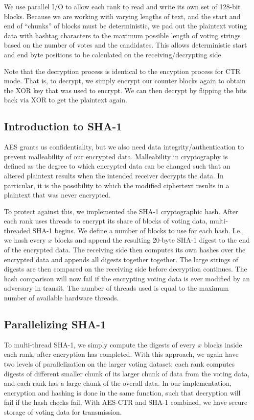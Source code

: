 \documentclass[final,5p,times,twocolumn,authoryear, 10pt]{elsarticle}
\begin{document}
We use parallel I/O to allow each rank to read and write its own set of 128-bit
blocks. Because we are working with varying lengths of text, and the start and
end of ``chunks'' of blocks must be deterministic, we pad out the plaintext
voting data with hashtag characters to the maximum possible length of voting
strings based on the number of votes and the candidates. This allows
deterministic start and end byte positions to be calculated on the
receiving/decrypting side.

Note that the decryption process is identical to the encyption process for CTR
mode. That is, to decrypt, we simply encrypt our counter blocks again to obtain
the XOR key that was used to encrypt. We can then decrypt by flipping the bits
back via XOR to get the plaintext again.

\subsection{Introduction to SHA-1}

AES grants us confidentiality, but we also need data integrity/authentication
to prevent malleability of our encrypted data. Malleability in cryptography is
defined as the degree to which encrypted data can be changed such that an
altered plaintext results when the intended receiver decrypts the data. In
particular, it is the possibility to which the modified ciphertext results in a
plaintext that was never encrypted.

To protect against this, we implemented the SHA-1 cryptographic hash. After each
rank uses threads to encrypt its share of blocks of voting data, multi-threaded
SHA-1 begins. We define a number of blocks to use for each hash. I.e., we hash
every $x$ blocks and append the resulting 20-byte SHA-1 digest to the end of the
encrypted data. The receiving side then computes its own hashes over the
encrypted data and appends all digests together together. The large strings of
digests are then compared on the receiving side before decryption continues. The
hash comparison will now fail if the encrypting voting data is ever modified by
an adversary in transit. The number of threads used is equal to the maximum
number of available hardware threads.

\subsection{Parallelizing SHA-1}

To multi-thread SHA-1, we simply compute the digests of every $x$ blocks inside
each rank, after encryption has completed. With this approach, we again have two
levels of parallelization on the larger voting dataset: each rank computes
digests of different smaller chunk of its larger chunk of data from the voting
data, and each rank has a large chunk of the overall data. In our
implementation, encryption and hashing is done in the same function, such that
decryption will fail if the hash checks fail. With AES-CTR and SHA-1 combined,
we have secure storage of voting data for transmission.
\end{document}

